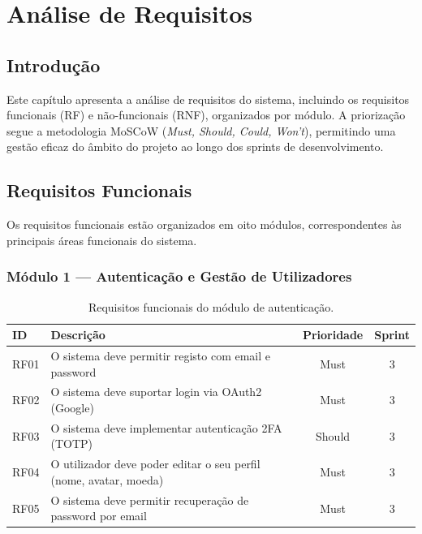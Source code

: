 \chapter{Análise de Requisitos}
\label{chap:requisitos}

\section{Introdução}
\label{sec:req-intro}

Este capítulo apresenta a análise de requisitos do sistema, incluindo os requisitos funcionais (RF) e não-funcionais (RNF), organizados por módulo. A priorização segue a metodologia MoSCoW (\textit{Must, Should, Could, Won't}), permitindo uma gestão eficaz do âmbito do projeto ao longo dos sprints de desenvolvimento.


\section{Requisitos Funcionais}
\label{sec:req-funcionais}

Os requisitos funcionais estão organizados em oito módulos, correspondentes às principais áreas funcionais do sistema.

\subsection{Módulo 1 --- Autenticação e Gestão de Utilizadores}

\begin{table}[H]
\centering
\caption{Requisitos funcionais do módulo de autenticação.}
\label{tab:rf-auth}
\small
\begin{tabularx}{\textwidth}{l X c c}
\toprule
\textbf{ID} & \textbf{Descrição} & \textbf{Prioridade} & \textbf{Sprint} \\
\midrule
RF01 & O sistema deve permitir registo com email e password & Must & 3 \\
RF02 & O sistema deve suportar login via OAuth2 (Google) & Must & 3 \\
RF03 & O sistema deve implementar autenticação \ac{2FA} (TOTP) & Should & 3 \\
RF04 & O utilizador deve poder editar o seu perfil (nome, avatar, moeda) & Must & 3 \\
RF05 & O sistema deve permitir recuperação de password por email & Must & 3 \\
\bottomrule
\end{tabularx}
\end{table}

